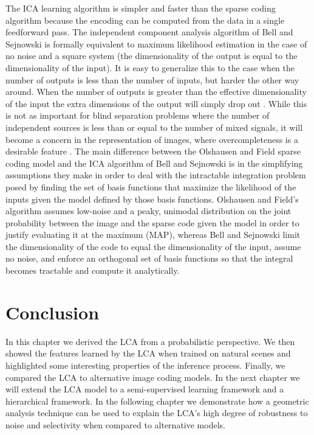 The ICA learning algorithm is simpler and faster than the sparse coding algorithm because the encoding can be computed from the data in a single feedforward pass. The independent component analysis algorithm of Bell and Sejnowski \citeyearpar{bell1997independent} is formally equivalent to maximum likelihood estimation in the case of no noise and a square system (the dimensionality of the output is equal to the dimensionality of the input). It is easy to generalize this to the case when the number of outputs is less than the number of inputs, but harder the other way around. When the number of outputs is greater than the effective dimensionality of the input the extra dimensions of the output will simply drop out \parencite{livezey2016degeneracy, le2011ica}. While this is not as important for blind separation problems where the number of independent sources is less than or equal to the number of mixed signals, it will become a concern in the representation of images, where overcompleteness is a desirable feature \parencite{simoncelli1991shiftable}. The main difference between the Olshausen and Field \citeyearpar{olshausen1996emergence} sparse coding model and the ICA algorithm of Bell and Sejnowski \citeyearpar{bell1997independent} is in the simplifying assumptions they make in order to deal with the intractable integration problem posed by finding the set of basis functions that maximize the likelihood of the inputs given the model defined by those basis functions. Olshausen and Field’s algorithm assumes low-noise and a peaky, unimodal distribution on the joint probability between the image and the sparse code given the model in order to justify evaluating it at the maximum (MAP), whereas Bell and Sejnowski limit the dimensionality of the code to equal the dimensionality of the input, assume no noise, and enforce an orthogonal set of basis functions so that the integral becomes tractable and compute it analytically.


\section{Conclusion}
In this chapter we derived the LCA from a probabilistic perspective. We then showed the features learned by the LCA when trained on natural scenes and highlighted some interesting properties of the inference process. Finally, we compared the LCA to alternative image coding models. In the next chapter we will extend the LCA model to a semi-supervised learning framework and a hierarchical framework. In the following chapter we demonstrate how a geometric analysis technique can be used to explain the LCA's high degree of robustness to noise and selectivity when compared to alternative models.

